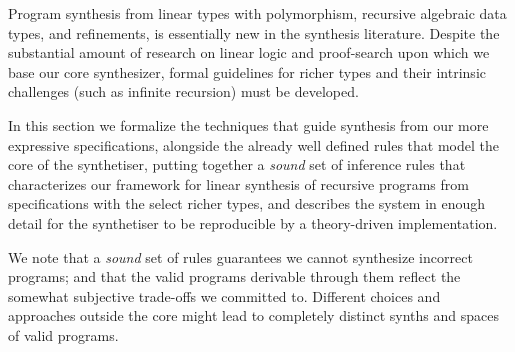 \documentclass{llncs}
\begin{document}

Program synthesis from linear types with polymorphism, recursive
algebraic data types, and refinements, is essentially new in the synthesis 
literature. Despite the substantial amount of research on linear logic and
proof-search upon which we base our core synthesizer, formal guidelines for
richer types and their intrinsic challenges (such as infinite
recursion) must be developed.

In this section we formalize  the techniques that guide
synthesis from our more expressive specifications, alongside the already well
defined rules that model the core of the synthetiser, putting together a
\emph{sound} set of inference rules that characterizes our framework
for linear synthesis of
recursive programs from specifications with the select richer types,
and describes the system in enough detail for the synthetiser to be reproducible
by a theory-driven implementation.

We note that a \emph{sound} set of rules guarantees we cannot synthesize
incorrect programs; and that the valid programs derivable through them
reflect the somewhat subjective trade-offs we committed to. Different
choices and approaches outside the core might lead to completely
distinct synths and spaces of valid programs.


\end{document}
